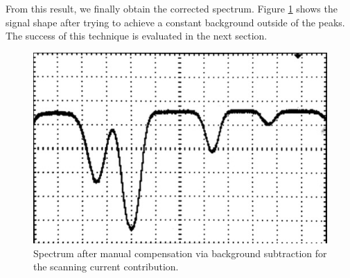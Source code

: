 From this result, we finally obtain the corrected spectrum. Figure \ref{fig:spectrum} shows the signal shape after trying to
achieve a constant background outside of the peaks. The success of this technique is evaluated in the next section.

\begin{figure}[H]
    \centering
    \includegraphics[width=0.72\linewidth]{content/measurement/spectrum.jpg}
    \captionsetup{width=0.8\linewidth}
    \caption{Spectrum after manual compensation via background subtraction for the scanning current contribution.}
    \label{fig:spectrum}
\end{figure}
